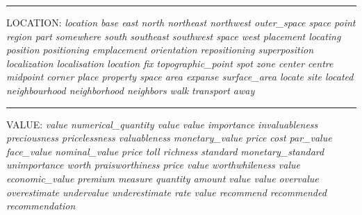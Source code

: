 \noindent\rule{16cm}{0.4pt}

LOCATION: \textit{location
base
east
north
northeast
northwest
outer\_space
space
point
region
part
somewhere
south
southeast
southwest
space
west
placement
locating
position
positioning
emplacement
orientation
repositioning
superposition
localization
localisation
location
fix
topographic\_point
spot
zone
center
centre
midpoint
corner
place
property
space
area
expanse
surface\_area
locate
site
located
neighbourhood
neighborhood
neighbors
walk
transport
away}

\noindent\rule{16cm}{0.4pt}

VALUE: \textit{value
numerical\_quantity
value
value
importance
invaluableness
preciousness
pricelessness
valuableness
monetary\_value
price
cost
par\_value
face\_value
nominal\_value
price
toll
richness
standard
monetary\_standard
unimportance
worth
praisworthiness
price
value
worthwhileness
value
economic\_value
premium
measure
quantity
amount
value
value
overvalue
overestimate
undervalue
underestimate
rate
value
recommend
recommended
recommendation}